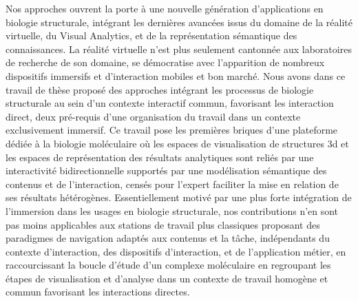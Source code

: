 Nos approches ouvrent la porte à une nouvelle génération d'applications en biologie structurale, intégrant les dernières avancées issus du domaine de la réalité virtuelle, du Visual Analytics, et de la représentation sémantique des connaissances. La réalité virtuelle n'est plus seulement cantonnée aux laboratoires de recherche de son domaine, se démocratise avec l'apparition de nombreux dispositifs immersifs et d'interaction mobiles et bon marché. Nous avons dans ce travail de thèse proposé des approches intégrant les processus de biologie structurale au sein d'un contexte interactif commun, favorisant les interaction direct, deux pré-requis d'une organisation du travail dans un contexte exclusivement immersif. Ce travail pose les premières briques d'une plateforme dédiée à la biologie moléculaire où les espaces de visualisation de structures 3d et les espaces de représentation des résultats analytiques sont reliés par une interactivité bidirectionnelle supportés par une modélisation sémantique des contenus et de l'interaction, censés pour l'expert faciliter la mise en relation de ses résultats hétérogènes. Essentiellement motivé par une plus forte intégration de l'immersion dans les usages en biologie structurale, nos contributions n'en sont pas moins applicables aux stations de travail plus classiques proposant des paradigmes de navigation adaptés aux contenus et la tâche, indépendants du contexte d'interaction, des dispositifs d'interaction, et de l'application  métier, en raccourcissant la boucle d'étude d'un complexe moléculaire en regroupant les étapes de visualisation et d'analyse dans un contexte de travail homogène et commun favorisant les interactions directes.